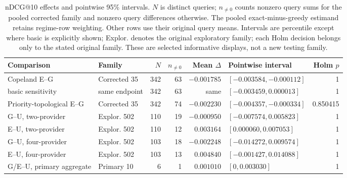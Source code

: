 \begin{table}[t]
\caption{nDCG@10 effects and pointwise 95\% intervals. $N$ is distinct queries; $n_{\ne0}$ counts nonzero query sums for the pooled corrected family and nonzero query differences otherwise. The pooled exact-minus-greedy estimand retains regime-row weighting. Other rows use their original query means. Intervals are percentile except where basic is explicitly shown; Explor. denotes the original exploratory family; each Holm decision belongs only to the stated original family. These are selected informative displays, not a new testing family.}
\label{tab:informative-support}\papertable
\begin{tabularx}{\linewidth}{@{}YL{1.55cm}rrrL{3.4cm}r@{}}\toprule
Comparison & Family & $N$ & $n_{\ne0}$ & Mean $\Delta$ & Pointwise interval & Holm $p$\\\midrule
Copeland E--G & Corrected 35 &342&63&$-0.001785$&$[-0.003584,-0.000112]$&1\\
\quad basic sensitivity & same endpoint &342&63&same&$[-0.003459,0.000013]$&1\\
Priority-topological E--G & Corrected 35 &342&74&$-0.002230$&$[-0.004357,-0.000334]$&0.850415\\\addlinespace
G--U, two-provider & Explor. 502 &110&19&$-0.000950$&$[-0.007574,0.005823]$&1\\
E--U, two-provider & Explor. 502 &110&12&$0.003164$&$[0.000060,0.007053]$&1\\
G--U, four-provider & Explor. 502 &103&18&$-0.002248$&$[-0.014272,0.009574]$&1\\
E--U, four-provider & Explor. 502 &103&13&$0.004840$&$[-0.001427,0.014088]$&1\\\addlinespace
G/E--U, primary aggregate & Primary 10 &6&1&$0.001010$&$[0,0.003030]$&1\\\bottomrule
\end{tabularx}
\end{table}
